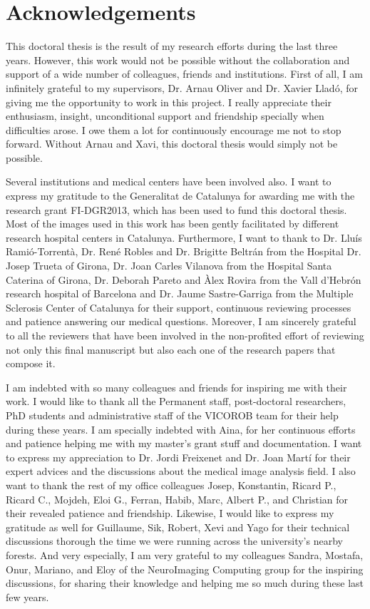 
\chapter*{Acknowledgements}


This doctoral thesis is the result of my research efforts during the last three years.  However, this work would not be possible without the collaboration and support of a wide number of colleagues, friends and institutions. First of all, I am infinitely grateful to my supervisors, Dr. Arnau Oliver and Dr. Xavier Lladó, for giving me the opportunity to work in this project. I really appreciate their enthusiasm, insight, unconditional support and friendship specially when difficulties arose. I owe them a lot for continuously encourage me not to stop forward. Without Arnau and Xavi, this doctoral thesis would simply not be possible.   

Several institutions and medical centers have been involved also.  I want to express my gratitude to the Generalitat de Catalunya for awarding me with the research grant FI-DGR2013, which has been used to fund this doctoral thesis. Most of the images used in this work has been gently facilitated by different research hospital centers in Catalunya. Furthermore, I want to thank to Dr. Lluís Ramió-Torrentà, Dr. René Robles and Dr. Brigitte Beltrán from the Hospital Dr. Josep Trueta of Girona, Dr. Joan Carles Vilanova from the Hospital Santa Caterina of Girona, Dr. Deborah Pareto and Àlex Rovira from the Vall d’Hebrón research hospital of Barcelona and Dr. Jaume Sastre-Garriga from the Multiple Sclerosis Center of Catalunya for their support, continuous reviewing processes and patience answering our medical questions.  Moreover, I am sincerely grateful to all the reviewers that have been involved in the non-profited effort of reviewing not only this final manuscript but also each one of the research papers that compose it.

I am indebted with so many colleagues and friends for inspiring me with their work.  I would like to thank all the Permanent staff, post-doctoral researchers, PhD students and administrative staff of the VICOROB team for their help during these years.  I am specially indebted with Aina, for her continuous efforts and patience helping me with my master’s grant stuff and documentation.  I want to express my appreciation to Dr. Jordi Freixenet and Dr. Joan Martí for their expert advices and the discussions about the medical image analysis field. I also want to thank the rest of my office colleagues Josep, Konstantin, Ricard P., Ricard C., Mojdeh, Eloi G., Ferran, Habib, Marc, Albert P., and Christian for their revealed patience and friendship.  Likewise, I would like to express my gratitude as well for Guillaume, Sik, Robert, Xevi and Yago for their technical discussions thorough the time we were running across the university's nearby forests. And very especially, I am very grateful to my colleagues Sandra, Mostafa, Onur, Mariano, and Eloy of the NeuroImaging Computing group for the inspiring discussions, for sharing their knowledge and helping me so much during these last few years.    

